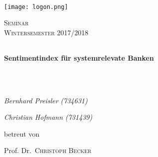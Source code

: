 

\setlength{\parindent}{0pt}

\renewcommand{\footrulewidth}{0.8pt}

\begin{titlepage}
	\text{}\vspace{-0.15cm}\\
	\begin{center}\hspace{-1.15cm} 
		\texttt{[image: logon.png]} 
	\end{center}
	
	\vspace{1.0cm}
	
	\vspace{0.25cm}
	
	\begin{center}\Large{\textsc{Seminar \\Wintersemester 2017/2018}}
	\end{center}\vspace{3.7cm}
	
	\begin{tabularx}
		{\textwidth}{l}
		\hline
	\end{tabularx}
	
	\begin{center}
		\LARGE{\textbf{Sentimentindex für systemrelevate Banken}}
	\end{center}
	
	\begin{tabularx}
		{\textwidth}{l}
		\hline
	\end{tabularx}\vspace{1.4cm}\\
	
	
	\begin{center}
		{\Large\itshape Bernhard Preisler (734631)\par}
		{\Large\itshape Christian Hofmann (731439)\par}
	\end{center}
	\vfill
	betreut von\par
	Prof. Dr.~\textsc{Christoph Becker}
	

\end{titlepage}
